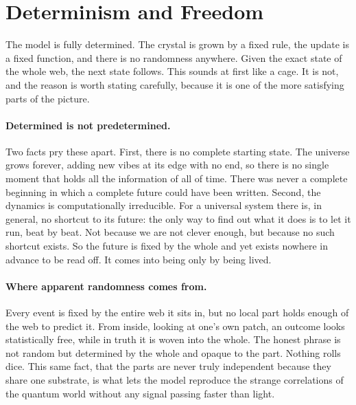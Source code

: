 \section{Determinism and Freedom}
\label{sec:freedom}

The model is fully determined. The crystal is grown by a fixed rule, the update is a fixed
function, and there is no randomness anywhere. Given the exact state of the whole web, the next
state follows. This sounds at first like a cage. It is not, and the reason is worth stating
carefully, because it is one of the more satisfying parts of the picture.

\paragraph{Determined is not predetermined.}
Two facts pry these apart. First, there is no complete starting state. The universe grows
forever, adding new vibes at its edge with no end, so there is no single moment that holds all
the information of all of time. There was never a complete beginning in which a complete future
could have been written. Second, the dynamics is computationally irreducible. For a universal
system there is, in general, no shortcut to its future: the only way to find out what it does
is to let it run, beat by beat. Not because we are not clever enough, but because no such
shortcut exists. So the future is fixed by the whole and yet exists nowhere in advance to be
read off. It comes into being only by being lived.

\paragraph{Where apparent randomness comes from.}
Every event is fixed by the entire web it sits in, but no local part holds enough of the web to
predict it. From inside, looking at one's own patch, an outcome looks statistically free, while
in truth it is woven into the whole. The honest phrase is not random but determined by the
whole and opaque to the part. Nothing rolls dice. This same fact, that the parts are never
truly independent because they share one substrate, is what lets the model reproduce the
strange correlations of the quantum world without any signal passing faster than light.

